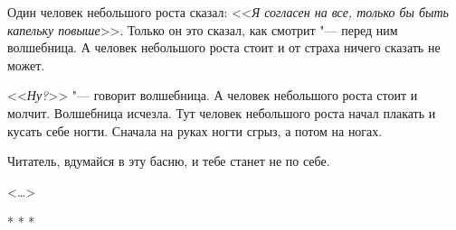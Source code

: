 
Один человек небольшого роста сказал: <<\textit{Я согласен на все, только бы быть капельку повыше}>>. Только он это сказал, как смотрит "--- перед ним волшебница. А человек небольшого роста стоит и от страха ничего сказать не может.

<<\textit{Ну?}>> "--- говорит волшебница. А человек небольшого роста стоит и молчит. Волшебница исчезла. Тут человек небольшого роста начал плакать и кусать себе ногти. Сначала на руках ногти сгрыз, а потом на ногах. 

Читатель, вдумайся в эту басню, и тебе станет не по себе.

\begin{flushright} <\dots> \end{flushright} 
\begin{center} * * * \end{center} 